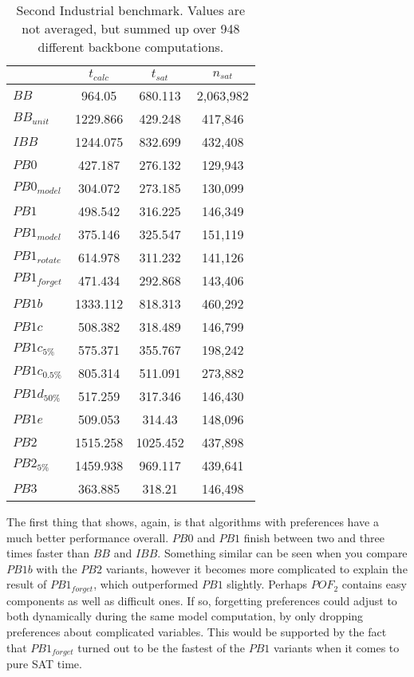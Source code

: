 \begin{wraptable}{R}{7.5cm}
\begin{tabular}{l| c c c}
& $t_{calc}$ & $t_{sat}$ & $n_{sat}$ \\
 \hline
$BB$ 				& 964.05 & 680.113 & 2,063,982\\
$BB_{unit}$ 		& 1229.866 & 429.248 & 417,846\\
$IBB$ 				& 1244.075 & 832.699 & 432,408\\
$PB0$ 				& 427.187 & 276.132 &  129,943\\
$PB0_{model}$ 		& 304.072 & 273.185 &  130,099\\
$PB1$ 				& 498.542 & 316.225 & 146,349\\
$PB1_{model}$ 		& 375.146 & 325.547 &  151,119\\
$PB1_{rotate}$ 		& 614.978 & 311.232 &  141,126\\
$PB1_{forget}$ 		& 471.434 & 292.868 &  143,406\\
$PB1b$ 				& 1333.112 & 818.313 &  460,292\\
$PB1c$ 				& 508.382 & 318.489 &  146,799\\
$PB1c_{5\%}$ 		& 575.371 & 355.767 &  198,242\\
$PB1c_{0.5\%}$ 		& 805.314 & 511.091 &  273,882\\
$PB1d_{50\%}$ 		& 517.259 & 317.346 & 146,430\\
$PB1e$ 				& 509.053 & 314.43 &  148,096\\
$PB2$ 				& 1515.258 & 1025.452 &  437,898\\
$PB2_{5\%}$ 		& 1459.938 & 969.117 &  439,641\\
$PB3$ 				& 363.885 & 318.21 &  146,498\\
\end{tabular}
\caption[Performance results of second industrial benchmark]{Second Industrial benchmark. Values are not averaged, but summed up over 948 different backbone computations.}
\label{tab:vonThore2pof} %
\end{wraptable}

The first thing that shows, again, is that algorithms with preferences have a much better performance overall. $PB0$ and $PB1$ finish between two and three times faster than $BB$ and $IBB$. Something similar can be seen when you compare $PB1b$ with the $PB2$ variants, however it becomes more complicated to explain the result of $PB1_{forget}$, which outperformed $PB1$ slightly. Perhaps $POF_2$ contains easy components as well as difficult ones. If so, forgetting preferences could adjust to both dynamically during the same model computation, by only dropping preferences about complicated variables. This would be supported by the fact that $PB1_{forget}$ turned out to be the fastest of the $PB1$ variants when it comes to pure SAT time.

